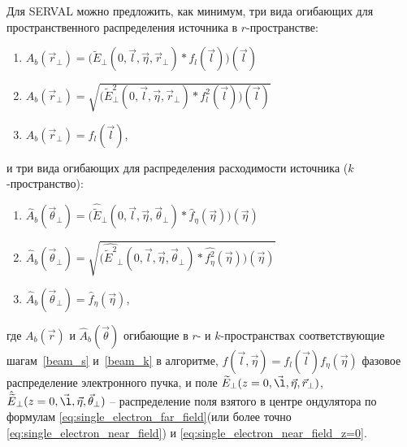 Для SERVAL можно предложить, как минимум, три вида огибающих для пространственного распределения источника в $r$-пространстве:
\begin{enumerate}[label=\Roman*.]
	\item \label{amplitude} ${A}_{b} (\vec{r}_{\bot}) = \big(\widetilde{E}_{\bot}(0, \vec{l}, \vec{\eta}, \vec{r}_{\bot}) \ast f_l(\vec{l})\big)(\vec{l})$ \\

	\item \label{intensity} ${A}_{b} (\vec{r}_{\bot}) = \sqrt{\big(\widetilde{E}^2_{\bot}(0,  \vec{l}, \vec{\eta}, \vec{r}_{\bot}) \ast f_l^2(\vec{l})\big)(\vec{l})}$ \\

	\item \label{e-beam} ${A}_{b} (\vec{r}_{\bot}) = f_l(\vec{l})$,
\end{enumerate}
и три вида огибающих для распределения расходимости источника ($k$-пространство):
\begin{enumerate}[label=\Roman*.]
	\item \label{amplitude} $\hat{{A}}_{b} (\vec{\theta}_{\bot}) = \big(\hat{\widetilde{E}}_{\bot}(0,  \vec{l}, \vec{\eta}, \vec{\theta}_{\bot}) \ast \hat{f}_{\eta}(\vec{\eta})\big)(\vec{\eta})$\\
	
	\item \label{intensity} $\hat{{A}}_{b} (\vec{\theta}_{\bot}) = \sqrt{\big(\hat{\widetilde{E}^2}_{\bot}(0,  \vec{l}, \vec{\eta}, \vec{\theta}_{\bot}) \ast \hat{f_{\eta}^2}(\vec{\eta})\big)(\vec{\eta})}$\\
	
	\item \label{e-beam} $\hat{{A}}_{b} (\vec{\theta}_{\bot}) = \hat{f}_{\eta}(\vec{\eta})$,
\end{enumerate}
где ${A}_{b} (\vec{r})$ и $\hat{{A}}_{b} (\vec{\theta})$ огибающие в $r$- и $k$-пространствах соответствующие шагам~\ref{beam_s} и~\ref{beam_k} в алгоритме,  $f(\vec{l}, \vec{\eta}) = f_l(\vec{l}) f_{\eta}(\vec{\eta})$ фазовое распределение электронного пучка, и поле $\widetilde{E}_{\bot}(z=0, \vec{\l}, \vec{\eta}, \vec{r}_{\bot})$, $\hat{\widetilde{E}}_{\bot}(z=0 , \vec{\l}, \vec{\eta}, \vec{\theta}_{\bot})$ -- распределение поля взятого в центре ондулятора по формулам \ref{eq:single_electron_far_field}(или более точно \ref{eq:single_electron_near_field}) и \ref{eq:single_electron_near_field_z=0}.

